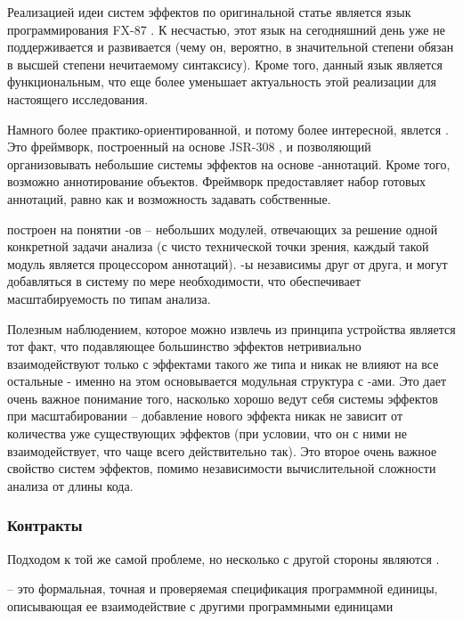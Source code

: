 Реализацией идеи систем эффектов по оригинальной статье является язык программирования FX-87 \cite{FX87}. К несчастью, этот язык на сегодняшний день уже не поддерживается и развивается (чему он, вероятно, в значительной степени обязан в высшей степени нечитаемому синтаксису). Кроме того, данный язык является функциональным, что еще более уменьшает актуальность этой реализации для настоящего исследования.

Намного более практико-ориентированной, и потому более интересной, явлется  \cite{checker-framework}. Это фреймворк, построенный на основе JSR-308 \cite{JSR308}, и позволяющий организовывать небольшие системы эффектов на основе -аннотаций. Кроме того, возможно аннотирование объектов. Фреймворк предоставляет набор готовых аннотаций, равно как и возможность задавать собственные.

 построен на понятии -ов -- небольших модулей, отвечающих за решение одной конкретной задачи анализа (с чисто технической точки зрения, каждый такой модуль является процессором аннотаций). -ы независимы друг от друга, и могут добавляться в систему по мере необходимости, что обеспечивает масштабируемость по типам анализа.

Полезным наблюдением, которое можно извлечь из принципа устройства  является тот факт, что подавляющее большинство эффектов нетривиально взаимодействуют только с эффектами такого же типа и никак не влияют на все остальные - именно на этом основывается модульная структура с -ами. Это дает очень важное понимание того, насколько хорошо ведут себя системы эффектов при масштабировании -- добавление нового эффекта никак не зависит от количества уже существующих эффектов (при условии, что он с ними не взаимодействует, что чаще всего действительно так). Это второе очень важное свойство систем эффектов, помимо независимости вычислительной сложности анализа от длины кода.








\subsubsection{Контракты}

Подходом к той же самой проблеме, но несколько с другой стороны являются .

\begin{definition}
  \label{def-contract}
   -- это формальная, точная и проверяемая спецификация программной единицы, описывающая ее взаимодействие с другими программными единицами \cite{Meyer92}
\end{definition}

